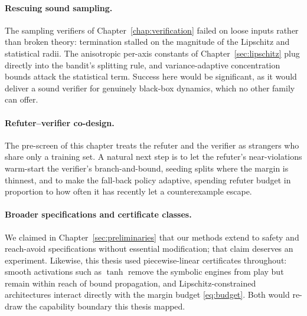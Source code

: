 \paragraph{Rescuing sound sampling.} The sampling verifiers of
Chapter~\ref{chap:verification} failed on loose inputs rather than broken
theory: termination stalled on the magnitude of the Lipschitz and statistical
radii. The anisotropic per-axis constants of Chapter~\ref{sec:lipschitz} plug
directly into the bandit's splitting rule, and variance-adaptive concentration
bounds attack the statistical term. Success here would be significant, as it
would deliver a sound verifier for genuinely black-box dynamics, which no
other family can offer.

\paragraph{Refuter--verifier co-design.} The pre-screen of this chapter treats
the refuter and the verifier as strangers who share only a training set. A
natural next step is to let the refuter's near-violations warm-start the
verifier's branch-and-bound, seeding splits where the margin is thinnest,
and to make the fall-back policy adaptive, spending refuter budget in
proportion to how often it has recently let a counterexample escape.

\paragraph{Broader specifications and certificate classes.} We claimed in
Chapter~\ref{sec:preliminaries} that our methods extend to safety and
reach-avoid specifications without essential modification; that claim deserves
an experiment. Likewise, this thesis used piecewise-linear certificates
throughout: smooth activations such as $\tanh$ remove the symbolic engines
from play but remain within reach of bound propagation, and
Lipschitz-constrained architectures interact directly with the margin budget
\eqref{eq:budget}. Both would re-draw the capability boundary this thesis
mapped.


\newpage

